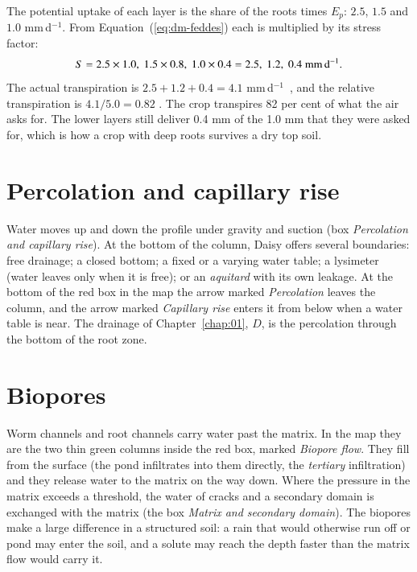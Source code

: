 \sol {}
\par\noindent The potential uptake of each layer is the share of the roots times $E_p$: $2.5$, $1.5$ and $1.0$ mm\,d$^{-1}$. From Equation~(\ref{eq:dm-feddes}) each is multiplied by its stress factor:
\[S=2.5\times1.0,\ 1.5\times0.8,\ 1.0\times0.4=2.5,\ 1.2,\ 0.4\ \text{mm\,d}^{-1} .\]
The actual transpiration is $2.5+1.2+0.4=4.1$ mm\,d$^{-1}$\ \finans, and the relative transpiration is $4.1/5.0=0.82$ \finans. The crop transpires 82 per cent of what the air asks for. The lower layers still deliver 0.4 mm of the 1.0 mm that they were asked for, which is how a crop with deep roots survives a dry top soil.

\section{Percolation and capillary rise}
Water moves up and down the profile under gravity and suction (box \emph{Percolation and capillary rise}). At the bottom of the column, Daisy offers several boundaries: free drainage; a closed bottom; a fixed or a varying water table; a lysimeter (water leaves only when it is free); or an \emph{aquitard} with its own leakage. At the bottom of the red box in the map the arrow marked \emph{Percolation} leaves the column, and the arrow marked \emph{Capillary rise} enters it from below when a water table is near. The drainage of Chapter~\ref{chap:01}, $D$, is the percolation through the bottom of the root zone.

\section{Biopores}
Worm channels and root channels carry water past the matrix. In the map they are the two thin green columns inside the red box, marked \emph{Biopore flow}. They fill from the surface (the pond infiltrates into them directly, the \emph{tertiary} infiltration) and they release water to the matrix on the way down. Where the pressure in the matrix exceeds a threshold, the water of cracks and a secondary domain is exchanged with the matrix (the box \emph{Matrix and secondary domain}). The biopores make a large difference in a structured soil: a rain that would otherwise run off or pond may enter the soil, and a solute may reach the depth faster than the matrix flow would carry it.

